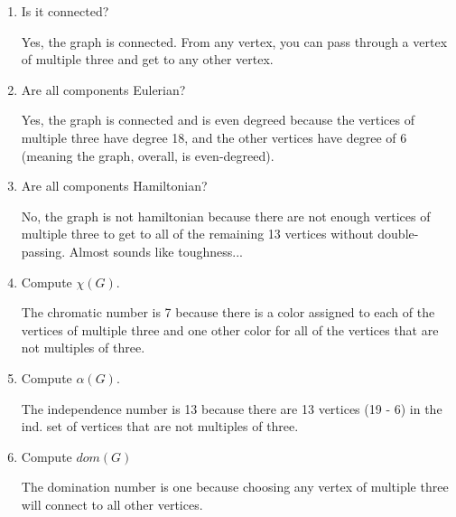 \documentclass[11pt]{article}
\begin{document}
\begin{enumerate}[leftmargin=*]
\begin{enumerate}
        \begin{solution}
            This graph is not bipartite because it would have to split into more than 2 independent sets. \color{red}I would have actually accepted ``no" here, but your explanation is circular enough that I have to ask: why can't it?\color{black} 
            \color{djs} Do you see how that was a circular argument? \color{black}
        \end{solution}
        \item Is it connected?
        \begin{solution}
            Yes, the graph is connected. From any vertex, you can pass through a vertex of multiple three and get to any other vertex.
        \end{solution}
        \item Are all components Eulerian?
        \begin{solution}
            Yes, the graph is connected and is even degreed because the vertices of multiple three have degree 18, and the other vertices have degree of 6 (meaning the graph, overall, is even-degreed). 
        \end{solution}
        \item Are all components Hamiltonian?
        \begin{solution}
            No, the graph is not hamiltonian because there are not enough vertices of multiple three to get to all of the remaining 13 vertices without double-passing. \color{red}Almost sounds like toughness...\color{black}
        \end{solution}
        \item Compute $\chi(G)$.
        \begin{solution}
            The chromatic number is 7 because there is a color assigned to each of the vertices of multiple three and one other color for all of the vertices that are not multiples of three.  
        \end{solution}
        \item Compute $\alpha(G)$.
        \begin{solution}
            The independence number is 13 because there are 13 vertices (19 - 6) in the ind. set of vertices that are not multiples of three.   
        \end{solution}
        \item Compute $dom(G)$
        \begin{solution}
            The domination number is one because choosing any vertex of multiple three will connect to all other vertices.    

\end{solution}
\end{enumerate}
\end{enumerate}
\end{document}
